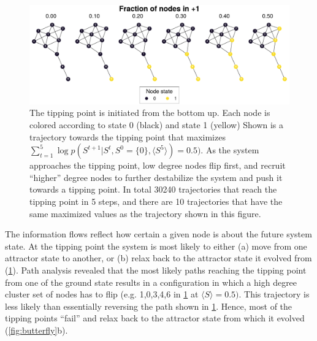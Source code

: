 \documentclass[a4paper, 11pt, twocolumn]{article}
\begin{document}
\begin{figure}
\centering
\includegraphics[width=.9\linewidth]{./figures/kite_maximized_trajectory_30230.pdf}
\caption{\label{fig:max_trajectory}The tipping point is initiated from the bottom up. Each node is colored according to state 0 (black) and state 1 (yellow) Shown is a trajectory towards  the tipping point that maximizes \(\sum_{{t=1}}^{{5}} \log p(S^{{t+1}} | S^t, S^0 =\{0\}, \langle S^5 \rangle ) = 0.5)\). As the system approaches the tipping point, low degree nodes flip first, and recruit ``higher'' degree nodes to further destabilize the system and push it towards a tipping point. In total 30240 trajectories that reach the tipping point in 5 steps, and there are 10 trajectories that have the same maximized values as the trajectory shown in this figure.}
\end{figure}

The information  flows reflect how  certain a given  node is
about  the future  system state.  At the  tipping point  the
system is most likely to  either (a) move from one attractor
state to another,  or (b) relax back to  the attractor state
it evolved  from (\cref{fig:max_trajectory}).  Path analysis
revealed  that the  most likely  paths reaching  the tipping
point  from   one  of   the  ground   state  results   in  a
configuration in  which a high  degree cluster set  of nodes
has to flip (e.g.  1,0,3,4,6 in \cref{fig:max_trajectory} at
\(\langle  S \rangle  =  0.5)\).  This trajectory  is  less likely  than
essentially     reversing     the      path     shown     in
\cref{fig:max_trajectory}. Hence, most of the tipping points
``fail'' and relax  back to the attractor state  from which it
evolved (\cref{fig:butterfly}{b}).
\end{document}
